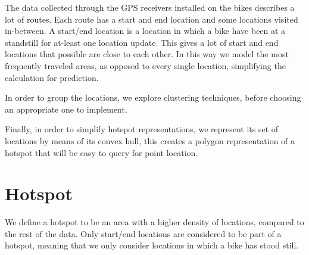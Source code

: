 The data collected through the GPS receivers installed on the bikes describes a lot of routes.
Each route has a start and end location and some locations visited in-between. A start/end location is a location in which a bike have been at a standstill for at-least one location update.
This gives a lot of start and end locations that possible are close to each other.
In this way we model the most frequently traveled areas, as opposed to every single location, simplifying the calculation for prediction.

In order to group the locations, we explore clustering techniques, before choosing an appropriate one to implement.

Finally, in order to simplify hotspot representations, we represent its set of locations by means of its convex hull, this creates a polygon representation of a hotspot that will be easy to query for point location.

\section{Hotspot}\label{hotspot}
We define a hotspot to be an area with a higher density of locations, compared to the rest of the data. Only start/end locations are considered to be part of a hotspot, meaning that we only consider locations in which a bike has stood still.